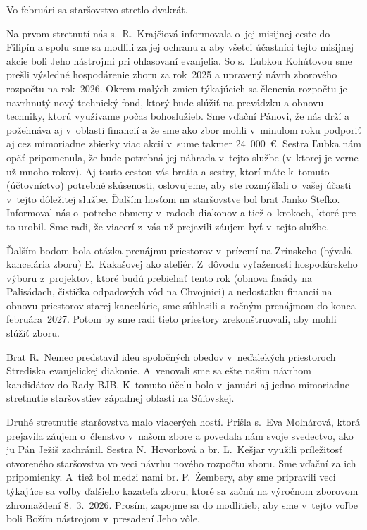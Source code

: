 

Vo februári sa staršovstvo stretlo dvakrát.

Na prvom stretnutí nás s.~R.~Krajčiová informovala o~jej misijnej ceste do Filipín a spolu sme sa modlili za jej ochranu a aby všetci účastníci tejto misijnej akcie boli Jeho nástrojmi pri ohlasovaní evanjelia. So s.~Ľubkou Kohútovou sme prešli výsledné hospodárenie zboru za rok~2025 a upravený návrh zborového rozpočtu na rok~2026. Okrem malých zmien týkajúcich sa členenia rozpočtu je navrhnutý nový technický fond, ktorý bude slúžiť na prevádzku a obnovu techniky, ktorú využívame počas bohoslužieb. Sme vďační Pánovi, že nás drží a požehnáva aj v~oblasti financií a že sme ako zbor mohli v~minulom roku podporiť aj cez mimoriadne zbierky viac akcií v~sume takmer 24~000~€. Sestra Ľubka nám opäť pripomenula, že bude potrebná jej náhrada v~tejto službe
(v~ktorej je verne už mnoho rokov). Aj touto cestou vás bratia a sestry, ktorí máte k~tomuto (účtovníctvo) potrebné skúsenosti, oslovujeme, aby ste rozmýšľali o~vašej účasti v~tejto dôležitej službe. Ďalším hosťom na staršovstve bol brat Janko Štefko. Informoval nás o~potrebe obmeny v~radoch diakonov a tiež o~krokoch, ktoré pre to urobil. Sme radi, že viacerí z~vás už prejavili záujem byť v~tejto službe.

Ďalším bodom bola otázka prenájmu priestorov v~prízemí na Zrínskeho (bývalá kancelária zboru) E.~Kakašovej ako ateliér. Z~dôvodu vyťaženosti hospodárskeho výboru z~projektov, ktoré budú prebiehať tento rok (obnova fasády na Palisádach, čistička odpadových vôd na Chvojnici) a nedostatku financií na obnovu priestorov starej kancelárie, sme súhlasili s~ročným prenájmom do konca februára~2027. Potom by sme radi tieto priestory zrekonštruovali, aby mohli slúžiť zboru.

Brat R.~Nemec predstavil ideu spoločných obedov v~neďalekých priestoroch Strediska evanjelickej diakonie. A~venovali sme sa ešte našim návrhom kandidátov do Rady BJB. K~tomuto účelu bolo v~januári aj jedno mimoriadne stretnutie staršovstiev západnej oblasti na Súľovskej.

Druhé stretnutie staršovstva malo viacerých hostí. Prišla s.~Eva Molnárová, ktorá prejavila záujem o~členstvo v~našom zbore a povedala nám svoje svedectvo, ako ju Pán Ježiš zachránil. Sestra N.~Hovorková a br. Ľ.~Kešjar využili príležitosť otvoreného staršovstva vo veci návrhu nového rozpočtu zboru. Sme vďační za ich pripomienky. A~tiež bol medzi nami br. P.~Žembery, aby sme pripravili veci týkajúce sa voľby ďalšieho kazateľa zboru, ktoré sa začnú na výročnom zborovom zhromaždení 8.~3.~2026. Prosím, zapojme sa do modlitieb, aby sme v~tejto voľbe boli Božím nástrojom v~presadení Jeho vôle.
\vfill\break


